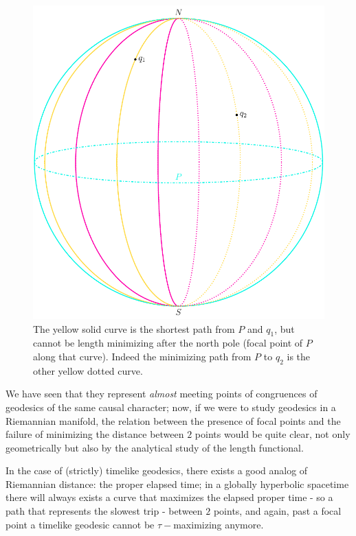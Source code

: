 \begin{figure}
\centering
\includegraphics[scale=0.42]{Immagini/sphere-focal-points/sphere-focal-points.pdf}
\caption[]{The yellow solid curve is the shortest path from \(P\) and \(q_1\), but cannot be length minimizing after the north pole (focal point of \(P\) along that curve). Indeed the minimizing path from \(P\) to \(q_2\) is the other yellow dotted curve.}
\label{fig:sphere-focal-points}
\end{figure}

We have seen that they represent \emph{almost} meeting points of congruences of geodesics of the same causal character; now, if we were to study geodesics in a Riemannian manifold, the relation between the presence of focal points and the failure of minimizing the distance between \(2\) points would be quite clear, not only geometrically but also by the analytical study of the length functional.

In the case of (strictly) timelike geodesics, there exists a good analog of Riemannian distance: the proper elapsed time; in a globally hyperbolic spacetime there will always exists a curve that maximizes the elapsed proper time - so a path that represents the slowest trip - between \(2\) points, and again, past a focal point a timelike geodesic cannot be \(\tau-\)maximizing anymore.

